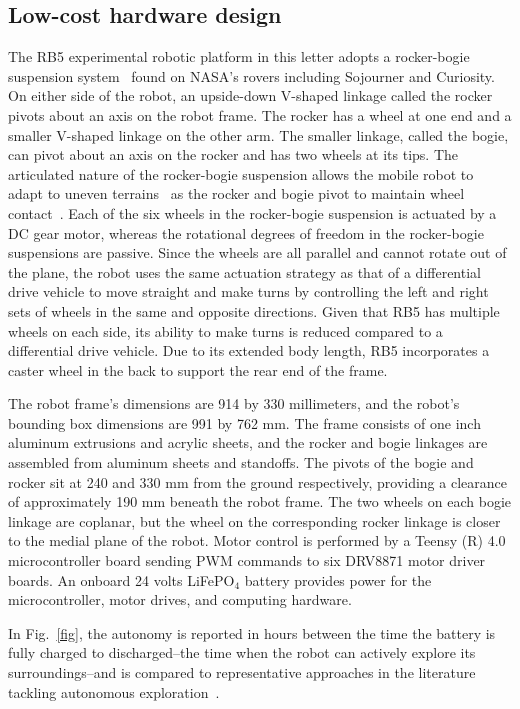 \documentclass[lettersize,journal]{IEEEtran}
\theoremstyle{definition}
\begin{document}
\subsection{Low-cost hardware design}
\label{sec:md}

The RB5 experimental robotic platform in this letter adopts a rocker-bogie suspension system~\cite{bickler1989articulated} found on NASA's rovers including Sojourner and Curiosity. On either side of the robot, an upside-down V-shaped linkage called the rocker pivots about an axis on the robot frame. The rocker has a wheel at one end and a smaller V-shaped linkage on the other arm. The smaller linkage, called the bogie, can pivot about an axis on the rocker and has two wheels at its tips. The articulated nature of the rocker-bogie suspension allows the mobile robot to adapt to uneven terrains~\cite{kim2012optimal,mann2005dynamic,faisal2021low} as the rocker and bogie pivot to maintain wheel contact~\cite{mann2005dynamic}.
%
Each of the six wheels in the rocker-bogie suspension is actuated by a DC gear motor, whereas the rotational degrees of freedom in the rocker-bogie suspensions are passive. Since the wheels are all parallel and cannot rotate out of the plane, the robot uses the same actuation strategy as that of a differential drive vehicle to move straight and make turns by controlling the left and right sets of wheels in the same and opposite directions. Given that RB5 has multiple wheels on each side, its ability to make turns is reduced compared to a differential drive vehicle. Due to its extended body length, RB5 incorporates a caster wheel in the back to support the rear end of the frame.

The robot frame's dimensions are 914 by 330 millimeters, and the robot's bounding box dimensions are 991 by 762 mm. The frame consists of one inch aluminum extrusions and acrylic sheets, and the rocker and bogie linkages are assembled from aluminum sheets and standoffs. The pivots of the bogie and rocker sit at 240 and 330 mm from the ground respectively, providing a clearance of approximately 190 mm beneath the robot frame. The two wheels on each bogie linkage are coplanar, but the wheel on the corresponding rocker linkage is closer to the medial plane of the robot. Motor control is performed by a Teensy (R) 4.0 microcontroller board sending PWM commands to six DRV8871 motor driver boards. An onboard 24 volts LiFePO${}_\text{4}$ battery provides power for the microcontroller, motor drives, and computing hardware.

In Fig.~\ref{fig}, the autonomy is reported in hours between the time the battery is fully charged to discharged--the time when the robot can actively explore its surroundings--and is compared to representative approaches in the literature tackling autonomous exploration~\cite{schmid2020efficient,kulkarni2022autonomous,muller2021openbot,tranzatto2022cerberus,roucek2020darpa,surmann2003autonomous}.
\end{document}
